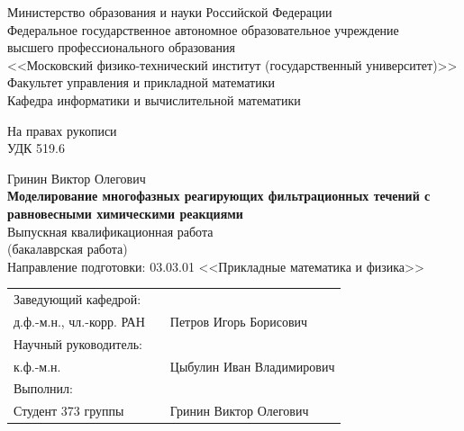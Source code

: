 \documentclass[14pt,a4paper]{extarticle}
\begin{document}
\thispagestyle{empty}


\begin{center}
	Министерство образования и науки Российской Федерации\\[6pt]
	
	Федеральное государственное автономное образовательное учреждение\\
	высшего профессионального образования\\
	<<Московский физико-технический институт (государственный университет)>>\\[6pt]
	
	Факультет управления и прикладной математики\\[6pt]
	Кафедра информатики и вычислительной математики\\[6pt]	
\end{center} 
\vspace{20mm}

\begin{flushright}
На правах рукописи\\
УДК 519.6
\end{flushright}

\begin{center}
	Гринин Виктор Олегович\\[6pt]
	
	{\large {\bf Моделирование многофазных реагирующих фильтрационных течений с равновесными химическими реакциями}}\\[6pt]
	
	Выпускная квалификационная работа\\
	(бакалаврская работа)\\
	
	Направление подготовки: 03.03.01 <<Прикладные математика и физика>>
\end{center}

\vspace{20mm}

\begin{flushleft}
	\begin{tabularx}{\textwidth}{lcl}
		Заведующий кафедрой: \\
		д.ф.-м.н., чл.-корр. РАН  & \raisebox{-3pt}{\rule{4cm}{0.5pt}} & Петров Игорь Борисович \\[5mm]
	
		Научный руководитель:\\
		к.ф.-м.н. & \raisebox{-3pt}{\rule{4cm}{0.5pt}} & Цыбулин Иван Владимирович \\[5mm]	
	
		Выполнил: \\
		Студент 373 группы  & \raisebox{-3pt}{\rule{4cm}{0.5pt}} & Гринин Виктор Олегович \\[5mm]
		
	\end{tabularx}
\end{flushleft}
\end{document}
